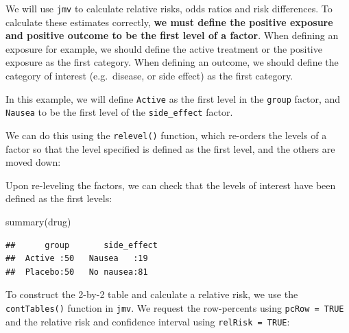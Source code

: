 \documentclass[
]{memoir}
\newenvironment{Shaded}{\begin{snugshade}}{\end{snugshade}}
\newcommand{\AttributeTok}[1]{\textcolor[rgb]{0.77,0.63,0.00}{#1}}
\newcommand{\CommentTok}[1]{\textcolor[rgb]{0.56,0.35,0.01}{\textit{#1}}}
\newcommand{\FunctionTok}[1]{\textcolor[rgb]{0.00,0.00,0.00}{#1}}
\newcommand{\NormalTok}[1]{#1}
\newcommand{\OtherTok}[1]{\textcolor[rgb]{0.56,0.35,0.01}{#1}}
\newcommand{\SpecialCharTok}[1]{\textcolor[rgb]{0.00,0.00,0.00}{#1}}
\newcommand{\StringTok}[1]{\textcolor[rgb]{0.31,0.60,0.02}{#1}}
\begin{document}
We will use \texttt{jmv} to calculate relative risks, odds ratios and risk differences. To calculate these estimates correctly, \textbf{we must define the positive exposure and positive outcome to be the first level of a factor}. When defining an exposure for example, we should define the active treatment or the positive exposure as the first category. When defining an outcome, we should define the category of interest (e.g.~disease, or side effect) as the first category.

In this example, we will define \texttt{Active} as the first level in the \texttt{group} factor, and \texttt{Nausea} to be the first level of the \texttt{side\_effect} factor.

We can do this using the \texttt{relevel()} function, which re-orders the levels of a factor so that the level specified is defined as the first level, and the others are moved down:

\begin{Shaded}
\end{Shaded}

Upon re-leveling the factors, we can check that the levels of interest have been defined as the first levels:

\begin{Shaded}
\begin{Highlighting}[]
\FunctionTok{summary}\NormalTok{(drug)}
\end{Highlighting}
\end{Shaded}

\begin{verbatim}
##      group       side_effect
##  Active :50   Nausea   :19  
##  Placebo:50   No nausea:81
\end{verbatim}

To construct the 2-by-2 table and calculate a relative risk, we use the \texttt{contTables()} function in \texttt{jmv}. We request the row-percents using \texttt{pcRow\ =\ TRUE} and the relative risk and confidence interval using \texttt{relRisk\ =\ TRUE}:
\end{document}
